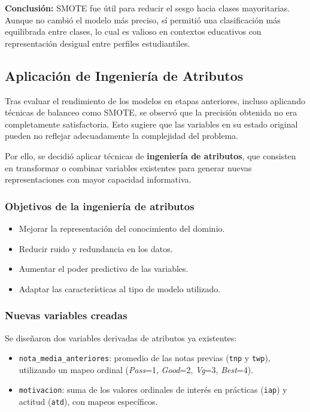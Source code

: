 \documentclass[11pt,a4paper]{article}
\begin{document}
\textbf{Conclusión:} SMOTE fue útil para reducir el sesgo hacia clases mayoritarias. Aunque no cambió el modelo más preciso, sí permitió una clasificación más equilibrada entre clases, lo cual es valioso en contextos educativos con representación desigual entre perfiles estudiantiles.

\subsection{Aplicación de Ingeniería de Atributos}

Tras evaluar el rendimiento de los modelos en etapas anteriores, incluso aplicando técnicas de balanceo como SMOTE, se observó que la precisión obtenida no era completamente satisfactoria. Esto sugiere que las variables en su estado original pueden no reflejar adecuadamente la complejidad del problema.

Por ello, se decidió aplicar técnicas de \textbf{ingeniería de atributos}, que consisten en transformar o combinar variables existentes para generar nuevas representaciones con mayor capacidad informativa.

\subsubsection*{Objetivos de la ingeniería de atributos}

\begin{itemize}
    \item Mejorar la representación del conocimiento del dominio.
    \item Reducir ruido y redundancia en los datos.
    \item Aumentar el poder predictivo de las variables.
    \item Adaptar las características al tipo de modelo utilizado.
\end{itemize}

\subsubsection*{Nuevas variables creadas}

Se diseñaron dos variables derivadas de atributos ya existentes:

\begin{itemize}
    \item \texttt{nota\_media\_anteriores}: promedio de las notas previas (\texttt{tnp} y \texttt{twp}), utilizando un mapeo ordinal (\textit{Pass}=1, \textit{Good}=2, \textit{Vg}=3, \textit{Best}=4).
    \item \texttt{motivacion}: suma de los valores ordinales de interés en prácticas (\texttt{iap}) y actitud (\texttt{atd}), con mapeos específicos.
\end{itemize}
\end{document}
